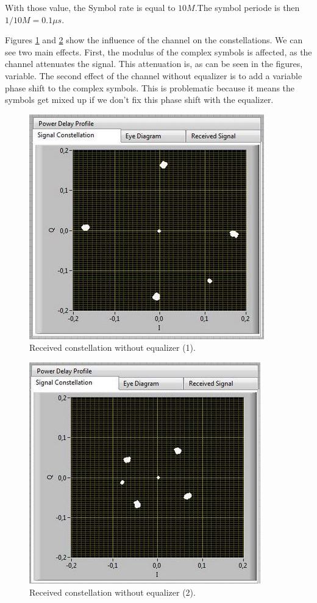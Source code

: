 \documentclass{article}
\begin{document}
    With those value, the Symbol rate is equal to $10M$.The symbol periode is then $1/10M = 0.1\mu s$.

Figures \ref{con1} and \ref{con2} show the influence of the channel on the constellations. We can see two main effects. First, the modulus of the complex symbols is affected, as the channel attenuates the signal. This attenuation is, as can be seen in the figures, variable. The second effect of the channel without equalizer is to add a variable phase shift to the complex symbols. This is problematic because it means the symbols get mixed up if we don't fix this phase shift with the equalizer.

\begin{figure}[h!]
    \centering
    \includegraphics[scale = 0.6]{con1}
    \caption{Received constellation without equalizer (1).}
    \label{con1}
\end{figure}

\begin{figure}[h!]
    \centering
    \includegraphics[scale = 0.6]{con2}
    \caption{Received constellation without equalizer (2).}
    \label{con2}
\end{figure}
\end{document}
